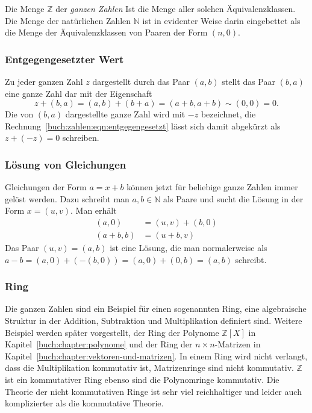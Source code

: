 Die Menge $\mathbb{Z}$ der {\em ganzen Zahlen} Ist die Menge aller solchen
Äquivalenzklassen.
Die Menge der natürlichen Zahlen $\mathbb{N}$ ist in evidenter Weise
darin eingebettet als die Menge der Äquivalenzklassen von Paaren der
Form $(n,0)$.

\subsubsection{Entgegengesetzter Wert}
Zu jeder ganzen Zahl $z$ dargestellt durch das Paar $(a,b)$ 
stellt das Paar $(b,a)$ eine ganze Zahl dar mit der Eigenschaft
\begin{equation}
z+(b,a)
=
(a,b) + (b+a) = (a+b,a+b) \sim (0,0) = 0.
\label{buch:zahlen:eqn:entgegengesetzt}
\end{equation}
Die von $(b,a)$ dargestellte ganze Zahl wird mit $-z$ bezeichnet,
die Rechnung~\eqref{buch:zahlen:eqn:entgegengesetzt} lässt sich damit
abgekürzt als $z+(-z)=0$ schreiben.

\subsubsection{Lösung von Gleichungen}
Gleichungen der Form $a=x+b$ können jetzt für beliebige ganze Zahlen
immer gelöst werden.
Dazu schreibt man $a,b\in\mathbb{N}$ als Paare und sucht die
Lösung in der Form $x=(u,v)$.
Man erhält
\begin{align*}
(a,0) &= (u,v) + (b,0)
\\
(a+b,b) &= (u+b,v)
\end{align*}
Das Paar $(u,v) = (a,b)$ ist eine Lösung, die man normalerweise als
$a-b = (a,0) + (-(b,0)) = (a,0) + (0,b) = (a,b)$ schreibt.

\subsubsection{Ring}
%
Die ganzen Zahlen sind ein Beispiel für einen sogenannten Ring,
eine algebraische Struktur in der Addition, Subtraktion und
Multiplikation definiert sind.
Weitere Beispiel werden später vorgestellt,
der Ring der Polynome $\mathbb{Z}[X]$ in Kapitel~\ref{buch:chapter:polynome}
und
der Ring der $n\times n$-Matrizen in
Kapitel~\ref{buch:chapter:vektoren-und-matrizen}.
In einem Ring wird nicht verlangt, dass die Multiplikation kommutativ
ist, Matrizenringe sind nicht kommutativ.
$\mathbb{Z}$ ist ein kommutativer Ring ebenso sind die Polynomringe 
kommutativ.
Die Theorie der nicht kommutativen Ringe ist sehr viel reichhaltiger
und leider auch komplizierter als die kommutative Theorie.
%





